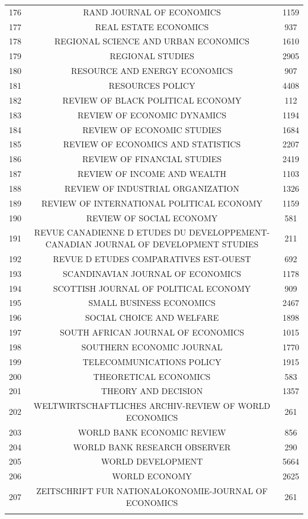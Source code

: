 \begin{tabular}{@{\extracolsep{5pt}} ccc}
176 & RAND JOURNAL OF ECONOMICS & 1159 \\ 
177 & REAL ESTATE ECONOMICS & 937 \\ 
178 & REGIONAL SCIENCE AND URBAN ECONOMICS & 1610 \\ 
179 & REGIONAL STUDIES & 2905 \\ 
180 & RESOURCE AND ENERGY ECONOMICS & 907 \\ 
181 & RESOURCES POLICY & 4408 \\ 
182 & REVIEW OF BLACK POLITICAL ECONOMY & 112 \\ 
183 & REVIEW OF ECONOMIC DYNAMICS & 1194 \\ 
184 & REVIEW OF ECONOMIC STUDIES & 1684 \\ 
185 & REVIEW OF ECONOMICS AND STATISTICS & 2207 \\ 
186 & REVIEW OF FINANCIAL STUDIES & 2419 \\ 
187 & REVIEW OF INCOME AND WEALTH & 1103 \\ 
188 & REVIEW OF INDUSTRIAL ORGANIZATION & 1326 \\ 
189 & REVIEW OF INTERNATIONAL POLITICAL ECONOMY & 1159 \\ 
190 & REVIEW OF SOCIAL ECONOMY & 581 \\ 
191 & REVUE CANADIENNE D ETUDES DU DEVELOPPEMENT-CANADIAN JOURNAL OF DEVELOPMENT STUDIES & 211 \\ 
192 & REVUE D ETUDES COMPARATIVES EST-OUEST & 692 \\ 
193 & SCANDINAVIAN JOURNAL OF ECONOMICS & 1178 \\ 
194 & SCOTTISH JOURNAL OF POLITICAL ECONOMY & 909 \\ 
195 & SMALL BUSINESS ECONOMICS & 2467 \\ 
196 & SOCIAL CHOICE AND WELFARE & 1898 \\ 
197 & SOUTH AFRICAN JOURNAL OF ECONOMICS & 1015 \\ 
198 & SOUTHERN ECONOMIC JOURNAL & 1770 \\ 
199 & TELECOMMUNICATIONS POLICY & 1915 \\ 
200 & THEORETICAL ECONOMICS & 583 \\ 
201 & THEORY AND DECISION & 1357 \\ 
202 & WELTWIRTSCHAFTLICHES ARCHIV-REVIEW OF WORLD ECONOMICS & 261 \\ 
203 & WORLD BANK ECONOMIC REVIEW & 856 \\ 
204 & WORLD BANK RESEARCH OBSERVER & 290 \\ 
205 & WORLD DEVELOPMENT & 5664 \\ 
206 & WORLD ECONOMY & 2625 \\ 
207 & ZEITSCHRIFT FUR NATIONALOKONOMIE-JOURNAL OF ECONOMICS & 261 \\ 
\hline \\[-1.8ex] 
\end{tabular} 



